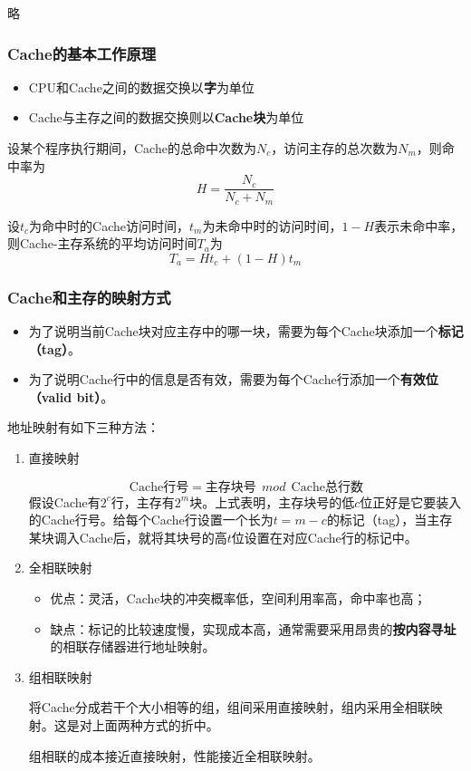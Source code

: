 \documentclass[12pt, a4paper, oneside]{ctexart}
\begin{document}
略

\subsubsection{Cache的基本工作原理}

\begin{itemize}
  \item CPU和Cache之间的数据交换以\textbf{字}为单位
  \item Cache与主存之间的数据交换则以\textbf{Cache块}为单位
\end{itemize}

设某个程序执行期间，Cache的总命中次数为$N_c$，访问主存的总次数为$N_m$，则命中率为
\begin{equation*}
  H=\frac{N_c}{N_c+N_m}
\end{equation*}

设$t_c$为命中时的Cache访问时间，$t_m$为未命中时的访问时间，$1-H$表示未命中率，则Cache-主存系统的平均访问时间$T_a$为
\begin{equation*}
  T_a=Ht_c+(1-H)t_m
\end{equation*}

\subsubsection{Cache和主存的映射方式}

\begin{itemize}
  \item 为了说明当前Cache块对应主存中的哪一块，需要为每个Cache块添加一个\textbf{标记（tag）}。
  \item 为了说明Cache行中的信息是否有效，需要为每个Cache行添加一个\textbf{有效位（valid bit）}。
\end{itemize}

地址映射有如下三种方法：
\begin{enumerate}
  \item {\kaishu 直接映射}
  
  \begin{equation*}
    \text{Cache行号}=\text{主存块号}\ \  mod\ \  \text{Cache总行数}
  \end{equation*}
  假设Cache有$2^c$行，主存有$2^m$块。上式表明，主存块号的低$c$位正好是它要装入的Cache行号。给每个Cache行设置一个长为$t=m-c$的标记（tag），当主存某块调入Cache后，就将其块号的高$t$位设置在对应Cache行的标记中。
  \item {\kaishu 全相联映射}
  
  \begin{itemize}
    \item 优点：灵活，Cache块的冲突概率低，空间利用率高，命中率也高；
    \item 缺点：标记的比较速度慢，实现成本高，通常需要采用昂贵的\textbf{按内容寻址}的相联存储器进行地址映射。
  \end{itemize}
  \item {\kaishu 组相联映射}
  
  将Cache分成若干个大小相等的组，组间采用直接映射，组内采用全相联映射。这是对上面两种方式的折中。

  组相联的成本接近直接映射，性能接近全相联映射。
\end{enumerate}
\end{document}
